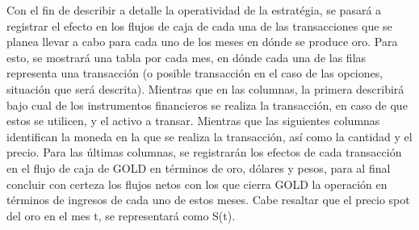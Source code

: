 \documentclass{article}
\theoremstyle{remark}
\theoremstyle{definition}
\begin{document}
Con el fin de describir a detalle la operatividad de la estratégia, se pasará a registrar el efecto en los flujos de caja de cada una de las transacciones que se planea llevar a cabo para cada uno de los meses en dónde se produce oro. Para esto, se mostrará una tabla por cada mes, en dónde cada una de las filas representa una transacción (o posible transacción en el caso de las opciones, situación que será descrita). Mientras que en las columnas, la primera describirá bajo cual de los instrumentos financieros se realiza la transacción, en caso de que estos se utilicen, y el activo a transar. Mientras que las siguientes columnas identifican la moneda en la que se realiza la transacción, así como la cantidad y el precio. Para las últimas columnas, se registrarán los efectos de cada transacción en el flujo de caja de GOLD en términos de oro, dólares y pesos, para al final concluir con certeza los flujos netos con los que cierra GOLD la operación en términos de ingresos de cada uno de estos meses. Cabe resaltar que el precio spot del oro en el mes t, se representará como S(t).
\end{document}
